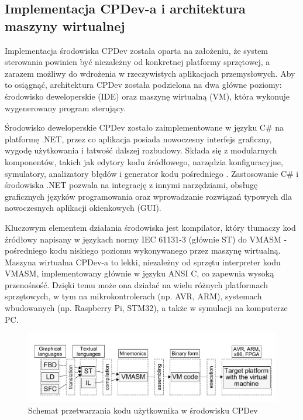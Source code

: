 \documentclass[12pt,twoside]{article}
\begin{document}
\subsection{Implementacja CPDev-a i architektura maszyny wirtualnej}

Implementacja środowiska CPDev została oparta na założeniu, że system sterowania powinien być niezależny od konkretnej platformy sprzętowej, a zarazem możliwy do wdrożenia w rzeczywistych aplikacjach przemysłowych. Aby to osiągnąć, architektura CPDev została podzielona na dwa główne poziomy: środowisko deweloperskie (IDE) oraz maszynę wirtualną (VM), która wykonuje wygenerowany program sterujący.

Środowisko deweloperskie CPDev zostało zaimplementowane w języku C\# na platformę .NET, przez co aplikacja posiada nowoczesny interfejs graficzny, wygodę użytkowania i łatwość dalszej rozbudowy. Składa się z modularnych komponentów, takich jak edytory kodu źródłowego, narzędzia konfiguracyjne, symulatory, analizatory błędów i generator kodu pośredniego \cite{cpdevOverview}. Zastosowanie C\# i środowiska .NET pozwala na integrację z innymi narzędziami, obsługę graficznych języków programowania oraz wprowadzanie rozwiązań typowych dla nowoczesnych aplikacji okienkowych (GUI).

Kluczowym elementem działania środowiska jest kompilator, który tłumaczy kod źródłowy napisany w językach normy IEC 61131-3 (głównie ST) do VMASM - pośredniego kodu niskiego poziomu wykonywanego przez maszynę wirtualną. Maszyna wirtualna CPDev-a to lekki, niezależny od sprzętu interpreter kodu VMASM, implementowany głównie w języku ANSI C, co zapewnia wysoką przenośność. Dzięki temu może ona działać na wielu różnych platformach sprzętowych, w tym na mikrokontrolerach (np. AVR, ARM), systemach wbudowanych (np. Raspberry Pi, STM32), a także w symulacji na komputerze PC\cite{cpdevVM}.

\begin{figure}[ht]
   \centering
   \includegraphics[width=15cm]{images/cpdevScheme.png}
   \caption{Schemat przetwarzania kodu użytkownika w środowisku CPDev\cite{cpdevOperations}}
   \label{Fig:cpdevScheme}
\end{figure}
\end{document}
